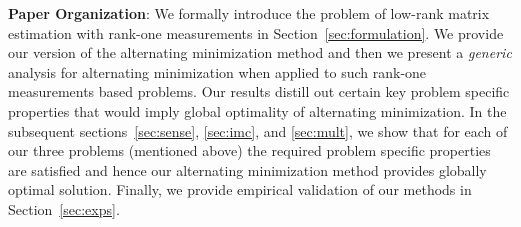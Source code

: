 \documentclass[11pt]{article}
\begin{document}

{\bf Paper Organization}: We formally introduce the problem of low-rank matrix estimation with rank-one measurements  in Section~\ref{sec:formulation}. We  provide our version of the alternating minimization method and then we present a {\em generic} analysis for  alternating minimization  when applied to such rank-one measurements based problems. Our results distill out certain key problem specific properties that would imply global optimality of alternating minimization. In the subsequent sections~\ref{sec:sense}, \ref{sec:imc}, and \ref{sec:mult}, we show that for each of our three problems (mentioned above) the required problem specific properties are satisfied and hence our alternating minimization method provides globally optimal solution. Finally, we provide empirical validation of our methods in Section~\ref{sec:exps}.%
\end{document}
